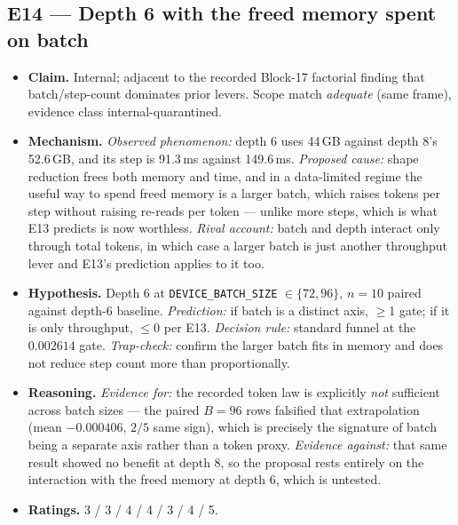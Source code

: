 \documentclass{article}
\begin{document}
\subsection{E14 --- Depth 6 with the freed memory spent on batch}
\begin{itemize}\itemsep2pt
\item \textbf{Claim.} Internal; adjacent to the recorded Block-17 factorial finding that batch/step-count dominates prior levers. Scope match \emph{adequate} (same frame), evidence class internal-quarantined.
\item \textbf{Mechanism.} \emph{Observed phenomenon:} depth 6 uses 44\,GB against depth 8's 52.6\,GB, and its step is 91.3\,ms against 149.6\,ms. \emph{Proposed cause:} shape reduction frees both memory and time, and in a data-limited regime the useful way to spend freed memory is a larger batch, which raises tokens per step without raising re-reads per token --- unlike more steps, which is what E13 predicts is now worthless. \emph{Rival account:} batch and depth interact only through total tokens, in which case a larger batch is just another throughput lever and E13's prediction applies to it too.
\item \textbf{Hypothesis.} Depth 6 at \texttt{DEVICE\_BATCH\_SIZE} $\in \{72, 96\}$, $n{=}10$ paired against depth-6 baseline. \emph{Prediction:} if batch is a distinct axis, $\ge$1 gate; if it is only throughput, $\le$0 per E13. \emph{Decision rule:} standard funnel at the $0.002614$ gate. \emph{Trap-check:} confirm the larger batch fits in memory and does not reduce step count more than proportionally.
\item \textbf{Reasoning.} \emph{Evidence for:} the recorded token law is explicitly \emph{not} sufficient across batch sizes --- the paired $B{=}96$ rows falsified that extrapolation (mean $-0.000406$, $2/5$ same sign), which is precisely the signature of batch being a separate axis rather than a token proxy. \emph{Evidence against:} that same result showed no benefit at depth 8, so the proposal rests entirely on the interaction with the freed memory at depth 6, which is untested.
\item \textbf{Ratings.} 3 / 3 / 4 / 4 / 3 / 4 / 5.
\end{itemize}
\end{document}

